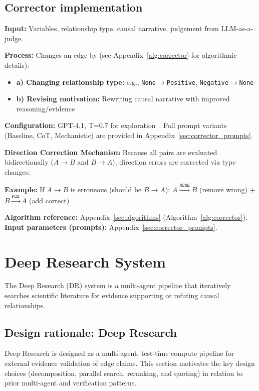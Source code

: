 \subsection{Corrector implementation}
\textbf{Input:} Variables, relationship type, causal narrative, judgement from LLM-as-a-judge.

\textbf{Process:} Changes an edge by (see Appendix~\ref{alg:corrector} for algorithmic details):
\begin{itemize}[noitemsep]
    \item \textbf{a) Changing relationship type:} e.g., \texttt{None}$\rightarrow$\texttt{Positive}, \texttt{Negative}$\rightarrow$\texttt{None}
    \item \textbf{b) Revising motivation:} Rewriting causal narrative with improved reasoning/evidence
\end{itemize}

\textbf{Configuration:} GPT-4.1, T=0.7 for exploration~\citep{madaan2023selfrefineiterativerefinementselffeedback}. Full prompt variants (Baseline, CoT, Mechanistic) are provided in Appendix~\ref{sec:corrector_prompts}.

\noindent\textbf{Direction Correction Mechanism}
Because all pairs are evaluated bidirectionally ($A \rightarrow B$ and $B \rightarrow A$), direction errors are corrected via type changes:

\textbf{Example:} If $A \rightarrow B$ is erroneous (should be $B \rightarrow A$):
$A \xrightarrow{\texttt{NONE}} B$ (remove wrong) + $B \xrightarrow{\texttt{POS}} A$ (add correct)

\textbf{Algorithm reference:} Appendix~\ref{sec:algorithms} (Algorithm~\ref{alg:corrector}). \textbf{Input parameters (prompts):} Appendix~\ref{sec:corrector_prompts}.

\section{Deep Research System}
\label{sec:deep_research_system}

The Deep Research (DR) system is a multi-agent pipeline that iteratively searches scientific literature for evidence supporting or refuting causal relationships.

\subsection{Design rationale: Deep Research}
Deep Research is designed as a multi-agent, test-time compute pipeline for external evidence validation of edge claims. This section motivates the key design choices (decomposition, parallel search, reranking, and quoting) in relation to prior multi-agent and verification patterns.

